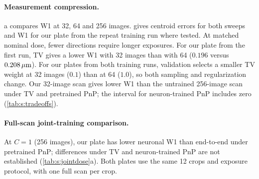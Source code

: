 \paragraph{Measurement compression.}
a compares W1 at 32, 64 and 256 images.  gives centroid errors for both sweeps and W1 for our plate from the repeat training run where tested. At matched nominal dose, fewer directions require longer exposures. For our plate from the first run, TV gives a lower W1 with 32 images than with 64 ($0.196$ versus $0.208\,\mu\mathrm{m}$). For our plates from both training runs, validation selects a smaller TV weight at 32 images ($0.1$) than at 64 ($1.0$), so both sampling and regularization change. Our 32-image scan gives lower W1 than the untrained 256-image scan under TV and pretrained PnP; the interval for neuron-trained PnP includes zero (\cref{tab:s:tradeoffs}).

\begin{table}[t]
\centering\small
\widetab{}
\caption{Acquisition sweeps in \cref{fig:s:budgetcurves}. The table gives centroid error for each plate and W1 for our plate from the repeat training run ($\mu$m). The 256-image scan uses every direction once. Each compressed setting averages five subsets. The 32-image and $1\times$ exposure columns report separate reconstructions of the same condition. Their displayed centroid means differ by at most $0.001\um$. Dashes mark conditions evaluated only for the first trained plate and the untrained plate.}
\label{tab:s:budgetdetails}
\end{table}

\begin{table}[t]
\centering\small
\widetab{}
\caption{Acquisition trade-offs on the 12 reference-selected crops. Values are W1 in $\mu$m; changes compare our plate with the untrained acquisition specified in each row, with paired cell-bootstrap 95\,\% intervals. The image-count comparison uses matched nominal dose; the dose comparison uses $C=8$ for both plates.}
\label{tab:s:tradeoffs}
\end{table}

\paragraph{Full-scan joint-training comparison.}
At $C=1$ (256 images), our plate has lower neuronal W1 than end-to-end under pretrained PnP; differences under TV and neuron-trained PnP are not established (\cref{tab:s:jointdose}a). Both plates use the same 12 crops and exposure protocol, with one full scan per crop.

